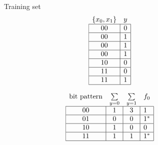 \begin{figure}[!htb]
\small
\begin{minipage}{.95\linewidth}\centering
  \begin{minipage}[b]{.19\linewidth}\centering
    Training set
    \vspace{-0.5em}
    \begin{align*}
      \begin{array}{cc}
        \{x_0,x_1\}                    & y                      \\ \hline
        \multicolumn{1}{|c|}{00} & \multicolumn{1}{c|}{0} \\ \hline
        \multicolumn{1}{|c|}{00} & \multicolumn{1}{c|}{1} \\ \hline
        \multicolumn{1}{|c|}{00} & \multicolumn{1}{c|}{1} \\ \hline
        \multicolumn{1}{|c|}{00} & \multicolumn{1}{c|}{1} \\ \hline
        \multicolumn{1}{|c|}{10} & \multicolumn{1}{c|}{0} \\ \hline
        \multicolumn{1}{|c|}{11} & \multicolumn{1}{c|}{0} \\ \hline
        \multicolumn{1}{|c|}{11} & \multicolumn{1}{c|}{1} \\ \hline
      \end{array}
    \end{align*}
  \end{minipage}
  \begin{minipage}[b]{.4\linewidth}\centering
    \begin{align*}
      \begin{array}{cccc}
          \text{bit pattern}        & \sum\limits_{y=0}      & \multicolumn{1}{l}{\sum\limits_{y=1}} & f_0  \\ \hline
        \multicolumn{1}{|c|}{00} & \multicolumn{1}{c|}{1} & \multicolumn{1}{c|}{3} & \multicolumn{1}{l|}{1} \\ \hline
        \multicolumn{1}{|c|}{01} & \multicolumn{1}{c|}{0} & \multicolumn{1}{c|}{0} & \multicolumn{1}{l|}{1^*} \\ \hline
        \multicolumn{1}{|c|}{10} & \multicolumn{1}{c|}{1} & \multicolumn{1}{c|}{0} & \multicolumn{1}{l|}{0} \\ \hline
        \multicolumn{1}{|c|}{11} & \multicolumn{1}{c|}{1} & \multicolumn{1}{c|}{1} & \multicolumn{1}{l|}{1^*} \\ \hline
      \end{array}
    \end{align*}
  \end{minipage}

\end{minipage}
\end{figure}
